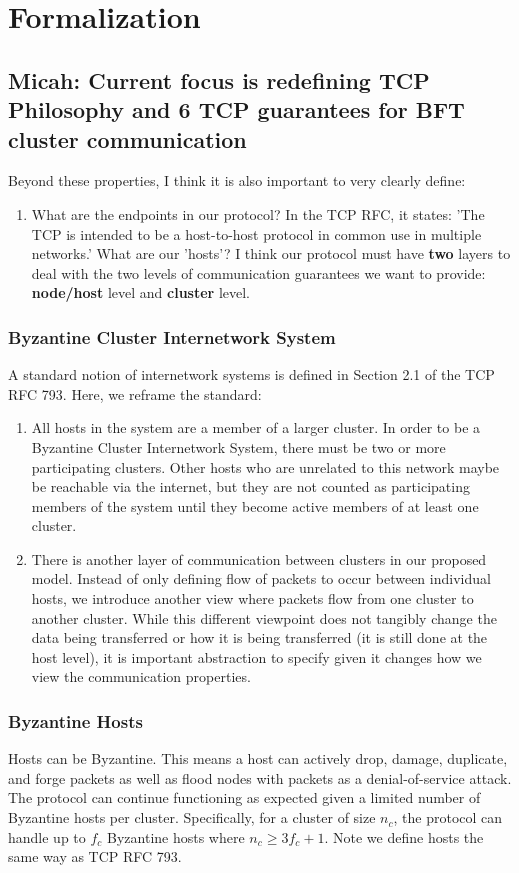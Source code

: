 \section{Formalization}
\subsection{Micah: Current focus is redefining TCP Philosophy and 6 TCP guarantees for BFT cluster communication}
Beyond these properties, I think it is also important to very clearly define:
\begin{enumerate}
    \item What are the endpoints in our protocol? In the TCP RFC, it states: 'The TCP is intended to be a host-to-host protocol 
        in common use in multiple networks.' What are our 'hosts'? I think our protocol must have \textbf{two} layers to deal with
        the two levels of communication guarantees we want to provide: \textbf{node/host} level and \textbf{cluster} level.
\end{enumerate}

\subsubsection{Byzantine Cluster Internetwork System}
A standard notion of internetwork systems is defined in Section 2.1 of the TCP RFC 793. Here, we reframe the standard:
\begin{enumerate}
    \item All hosts in the system are a member of a larger cluster. In order to be a Byzantine Cluster Internetwork System, there must be two or more participating clusters. Other hosts who are unrelated to this network maybe be reachable via the internet, but they are not counted as participating members of the system until they become active members of at least one cluster.
    \item There is another layer of communication between clusters in our proposed model. Instead of only defining flow of packets to occur between individual hosts, we introduce another view where packets flow from one cluster to another cluster. While this different viewpoint does not tangibly change the data being transferred or how it is being transferred (it is still done at the host level), it is important abstraction to specify given it changes how we view the communication properties.
\end{enumerate}

\subsubsection{Byzantine Hosts}
Hosts can be Byzantine. This means a host can actively drop, damage, duplicate, and forge packets as well as flood nodes with packets as a denial-of-service attack. The protocol can continue functioning as expected given a limited number of Byzantine hosts per cluster. Specifically, for a cluster of size $n_c$, the protocol can handle up to $f_c$ Byzantine hosts where $n_c \geq 3f_c + 1$. Note we define hosts the same way as TCP RFC 793.

